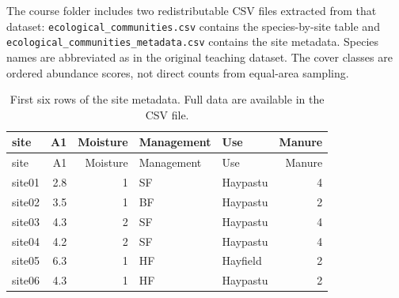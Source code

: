 \documentclass[
  english,
]{article}
\newenvironment{Shaded}{\begin{snugshade}}{\end{snugshade}}
\newcommand{\AttributeTok}[1]{\textcolor[rgb]{0.13,0.29,0.53}{#1}}
\newcommand{\ConstantTok}[1]{\textcolor[rgb]{0.56,0.35,0.01}{#1}}
\newcommand{\FunctionTok}[1]{\textcolor[rgb]{0.13,0.29,0.53}{\textbf{#1}}}
\newcommand{\NormalTok}[1]{#1}
\newcommand{\OtherTok}[1]{\textcolor[rgb]{0.56,0.35,0.01}{#1}}
\newcommand{\SpecialCharTok}[1]{\textcolor[rgb]{0.81,0.36,0.00}{\textbf{#1}}}
\newcommand{\StringTok}[1]{\textcolor[rgb]{0.31,0.60,0.02}{#1}}
\begin{document}
The course folder includes two redistributable CSV files extracted from
that dataset: \texttt{ecological\_communities.csv} contains the
species-by-site table and \texttt{ecological\_communities\_metadata.csv}
contains the site metadata. Species names are abbreviated as in the
original teaching dataset. The cover classes are ordered abundance
scores, not direct counts from equal-area sampling.

\begin{Shaded}
\end{Shaded}

\begin{longtable}[]{@{}lrrllr@{}}
\caption{First six rows of the site metadata. Full data are available in
the CSV file.}\tabularnewline
\toprule\noalign{}
site & A1 & Moisture & Management & Use & Manure \\
\midrule\noalign{}
\endfirsthead
\toprule\noalign{}
site & A1 & Moisture & Management & Use & Manure \\
\midrule\noalign{}
\endhead
\bottomrule\noalign{}
\endlastfoot
site01 & 2.8 & 1 & SF & Haypastu & 4 \\
site02 & 3.5 & 1 & BF & Haypastu & 2 \\
site03 & 4.3 & 2 & SF & Haypastu & 4 \\
site04 & 4.2 & 2 & SF & Haypastu & 4 \\
site05 & 6.3 & 1 & HF & Hayfield & 2 \\
site06 & 4.3 & 1 & HF & Haypastu & 2 \\
\end{longtable}
\end{document}
